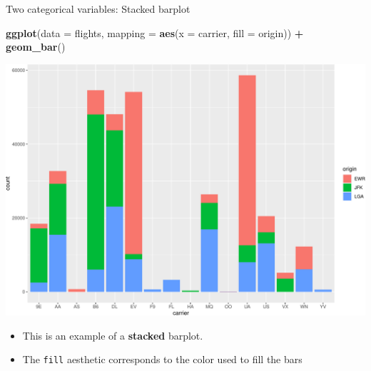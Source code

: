 \documentclass[
  ignorenonframetext,
]{beamer}
\newenvironment{Shaded}{\begin{snugshade}}{\end{snugshade}}
\newcommand{\AttributeTok}[1]{\textcolor[rgb]{0.13,0.29,0.53}{#1}}
\newcommand{\FunctionTok}[1]{\textcolor[rgb]{0.13,0.29,0.53}{\textbf{#1}}}
\newcommand{\NormalTok}[1]{#1}
\newcommand{\SpecialCharTok}[1]{\textcolor[rgb]{0.81,0.36,0.00}{\textbf{#1}}}
\providecommand{\tightlist}{%
  \setlength{\itemsep}{0pt}\setlength{\parskip}{0pt}}
\begin{document}
\begin{frame}[fragile]{Two categorical variables: Stacked barplot}
\protect\hypertarget{two-categorical-variables-stacked-barplot}{}
\tiny

\begin{Shaded}
\begin{Highlighting}[]
\FunctionTok{ggplot}\NormalTok{(}\AttributeTok{data =}\NormalTok{ flights, }\AttributeTok{mapping =} \FunctionTok{aes}\NormalTok{(}\AttributeTok{x =}\NormalTok{ carrier, }\AttributeTok{fill =}\NormalTok{ origin)) }\SpecialCharTok{+}
  \FunctionTok{geom\_bar}\NormalTok{()}
\end{Highlighting}
\end{Shaded}

\begin{center}\includegraphics[width=0.9\linewidth,height=0.5\textheight]{Week2_files/figure-beamer/unnamed-chunk-42-1} \end{center}
\normalsize

\begin{itemize}
\tightlist
\item
  This is an example of a \textbf{stacked} barplot.
\item
  The \texttt{fill} aesthetic corresponds to the color used to fill the
  bars
\end{itemize}
\end{frame}
\end{document}
